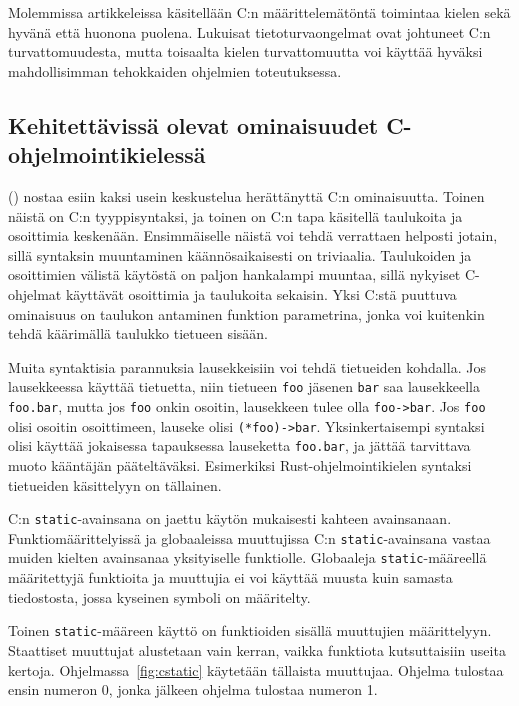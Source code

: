 Molemmissa artikkeleissa käsitellään C:n määrittelemätöntä toimintaa kielen
sekä hyvänä että huonona puolena. Lukuisat tietoturvaongelmat ovat johtuneet
C:n turvattomuudesta, mutta toisaalta kielen turvattomuutta voi käyttää hyväksi
mahdollisimman tehokkaiden ohjelmien toteutuksessa.

\subsection{Kehitettävissä olevat ominaisuudet C-ohjelmointikielessä}
\label{sec:ckehitettavat}

\citeauthor{chistory} (\citeyear{chistory}) nostaa esiin kaksi usein
keskustelua herättänyttä C:n ominaisuutta. Toinen näistä on C:n tyyppisyntaksi,
ja toinen on C:n tapa käsitellä taulukoita ja osoittimia keskenään.
Ensimmäiselle näistä voi tehdä verrattaen helposti jotain, sillä syntaksin
muuntaminen käännösaikaisesti on triviaalia. Taulukoiden ja osoittimien välistä
käytöstä on paljon hankalampi muuntaa, sillä nykyiset C-ohjelmat käyttävät
osoittimia ja taulukoita sekaisin. Yksi C:stä puuttuva ominaisuus on
taulukon antaminen funktion parametrina, jonka voi kuitenkin tehdä käärimällä
taulukko tietueen sisään.

Muita syntaktisia parannuksia lausekkeisiin voi tehdä tietueiden kohdalla. Jos
lausekkeessa käyttää tietuetta, niin tietueen \texttt{foo} jäsenen \texttt{bar}
saa lausekkeella \texttt{foo.bar}, mutta jos \texttt{foo} onkin osoitin,
lausekkeen tulee olla \texttt{foo->bar}. Jos \texttt{foo} olisi osoitin
osoittimeen, lauseke olisi \texttt{(*foo)->bar}. Yksinkertaisempi syntaksi
olisi käyttää jokaisessa tapauksessa lauseketta \texttt{foo.bar}, ja jättää
tarvittava muoto kääntäjän pääteltäväksi. Esimerkiksi Rust-ohjelmointikielen
syntaksi tietueiden käsittelyyn on tällainen.

C:n \texttt{static}-avainsana on jaettu käytön mukaisesti kahteen avainsanaan.
Funktiomäärittelyissä ja globaaleissa muuttujissa C:n
\texttt{static}-avainsana vastaa muiden kielten avainsanaa yksityiselle
funktiolle. Globaaleja \texttt{static}-määreellä määritettyjä funktioita ja
muuttujia ei voi käyttää muusta kuin samasta tiedostosta, jossa kyseinen
symboli on määritelty.

Toinen \texttt{static}-määreen käyttö on funktioiden sisällä muuttujien
määrittelyyn. Staattiset muuttujat alustetaan vain kerran, vaikka funktiota
kutsuttaisiin useita kertoja. Ohjelmassa~\ref{fig:cstatic} käytetään tällaista
muuttujaa. Ohjelma tulostaa ensin numeron 0, jonka jälkeen ohjelma tulostaa
numeron 1.

